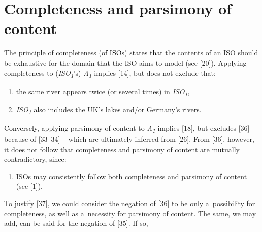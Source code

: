 \section{Completeness and parsimony of content}

The principle of completeness \textcolor{black}{(of ISOs) states that }the contents of an ISO should be exhaustive for the domain that the ISO aims to model (see [20]). Applying completeness to (\textit{ISO}\textit{\textsubscript{1}}\textcolor{black}{'s)} \textit{A}\textit{\textsubscript{1}} implies [14], but does not exclude that:



\setcounter{saveenum}{\value{enumi}}

\begin{enumerate}

\setcounter{enumi}{\value{saveenum}}

\item the same river appears twice (or several times) in \textit{ISO}\textit{\textsubscript{1}},

\item \textit{ISO}\textit{\textsubscript{1}} also includes the UK's lakes and/or Germany's rivers.

\end{enumerate}

\textcolor{black}{Conversely, applying }parsimony of content to \textit{A}\textit{\textsubscript{1}} implies [18], but excludes [36] because of [33–34] -- which are ultimately inferred from [26]. From [36], however, it does not follow that completeness and parsimony of content are mutually contradictory, since:



\setcounter{saveenum}{\value{enumi}}

\begin{enumerate}

\setcounter{enumi}{\value{saveenum}}

\item ISOs may consistently follow both completeness and parsimony of content (see [1]).

\end{enumerate}

To justify [37], we could consider the negation of [36] to be only a~possibility for completeness, as well as a~necessity for parsimony of content. The same, we may add, can be said for the negation of [35]. If so,



\setcounter{saveenum}{\value{enumi}}

